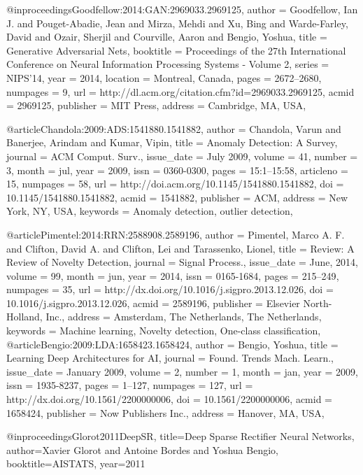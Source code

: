 @inproceedings{Goodfellow:2014:GAN:2969033.2969125,
 author = {Goodfellow, Ian J. and Pouget-Abadie, Jean and Mirza, Mehdi and Xu, Bing and Warde-Farley, David and Ozair, Sherjil and Courville, Aaron and Bengio, Yoshua},
 title = {Generative Adversarial Nets},
 booktitle = {Proceedings of the 27th International Conference on Neural Information Processing Systems - Volume 2},
 series = {NIPS'14},
 year = {2014},
 location = {Montreal, Canada},
 pages = {2672--2680},
 numpages = {9},
 url = {http://dl.acm.org/citation.cfm?id=2969033.2969125},
 acmid = {2969125},
 publisher = {MIT Press},
 address = {Cambridge, MA, USA},
} 

@article{Chandola:2009:ADS:1541880.1541882,
 author = {Chandola, Varun and Banerjee, Arindam and Kumar, Vipin},
 title = {Anomaly Detection: A Survey},
 journal = {ACM Comput. Surv.},
 issue_date = {July 2009},
 volume = {41},
 number = {3},
 month = jul,
 year = {2009},
 issn = {0360-0300},
 pages = {15:1--15:58},
 articleno = {15},
 numpages = {58},
 url = {http://doi.acm.org/10.1145/1541880.1541882},
 doi = {10.1145/1541880.1541882},
 acmid = {1541882},
 publisher = {ACM},
 address = {New York, NY, USA},
 keywords = {Anomaly detection, outlier detection},
} 

@article{Pimentel:2014:RRN:2588908.2589196,
 author = {Pimentel, Marco A. F. and Clifton, David A. and Clifton, Lei and Tarassenko, Lionel},
 title = {Review: A Review of Novelty Detection},
 journal = {Signal Process.},
 issue_date = {June, 2014},
 volume = {99},
 month = jun,
 year = {2014},
 issn = {0165-1684},
 pages = {215--249},
 numpages = {35},
 url = {http://dx.doi.org/10.1016/j.sigpro.2013.12.026},
 doi = {10.1016/j.sigpro.2013.12.026},
 acmid = {2589196},
 publisher = {Elsevier North-Holland, Inc.},
 address = {Amsterdam, The Netherlands, The Netherlands},
 keywords = {Machine learning, Novelty detection, One-class classification},
} 
@article{Bengio:2009:LDA:1658423.1658424,
 author = {Bengio, Yoshua},
 title = {Learning Deep Architectures for AI},
 journal = {Found. Trends Mach. Learn.},
 issue_date = {January 2009},
 volume = {2},
 number = {1},
 month = jan,
 year = {2009},
 issn = {1935-8237},
 pages = {1--127},
 numpages = {127},
 url = {http://dx.doi.org/10.1561/2200000006},
 doi = {10.1561/2200000006},
 acmid = {1658424},
 publisher = {Now Publishers Inc.},
 address = {Hanover, MA, USA},
} 


@inproceedings{Glorot2011DeepSR,
  title={Deep Sparse Rectifier Neural Networks},
  author={Xavier Glorot and Antoine Bordes and Yoshua Bengio},
  booktitle={AISTATS},
  year={2011}
}


